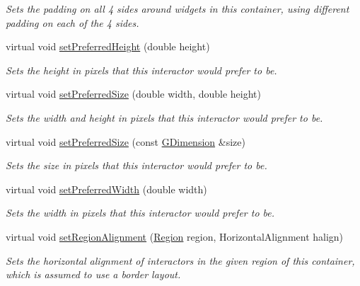 \begin{DoxyCompactItemize}
\begin{DoxyCompactList}\small\item\em Sets the padding on all 4 sides around widgets in this container, using different padding on each of the 4 sides. \end{DoxyCompactList}\item 
virtual void \mbox{\hyperlink{classGInteractor_a1ab987704fce32098706c6f00fb08218}{set\+Preferred\+Height}} (double height)
\begin{DoxyCompactList}\small\item\em Sets the height in pixels that this interactor would prefer to be. \end{DoxyCompactList}\item 
virtual void \mbox{\hyperlink{classGInteractor_a042c5ae19430d765ef552371cae3632c}{set\+Preferred\+Size}} (double width, double height)
\begin{DoxyCompactList}\small\item\em Sets the width and height in pixels that this interactor would prefer to be. \end{DoxyCompactList}\item 
virtual void \mbox{\hyperlink{classGInteractor_aa22d9be4bc0e078bb0ea69b0fc9d7c75}{set\+Preferred\+Size}} (const \mbox{\hyperlink{classGDimension}{G\+Dimension}} \&size)
\begin{DoxyCompactList}\small\item\em Sets the size in pixels that this interactor would prefer to be. \end{DoxyCompactList}\item 
virtual void \mbox{\hyperlink{classGInteractor_a3db429ab2fa52efd187eec0ed8cdd9f2}{set\+Preferred\+Width}} (double width)
\begin{DoxyCompactList}\small\item\em Sets the width in pixels that this interactor would prefer to be. \end{DoxyCompactList}\item 
virtual void \mbox{\hyperlink{classGContainer_a96e9f5593c0193bbdc7ae99945b9cf5f}{set\+Region\+Alignment}} (\mbox{\hyperlink{classGContainer_a81a01a86de31071a92e6cce0bab9bc4b}{Region}} region, Horizontal\+Alignment halign)
\begin{DoxyCompactList}\small\item\em Sets the horizontal alignment of interactors in the given region of this container, which is assumed to use a border layout. \end{DoxyCompactList}\item 

\end{DoxyCompactItemize}
